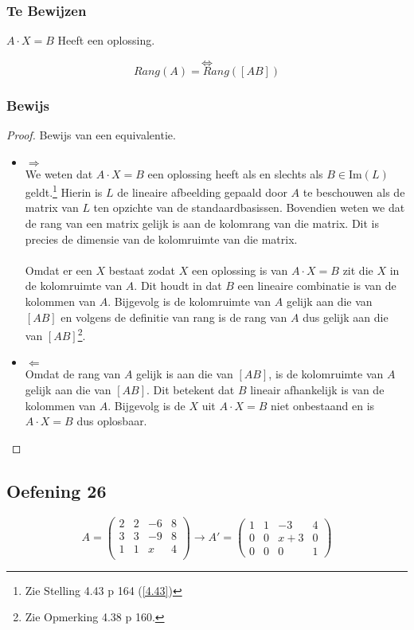 \documentclass[lineaire_algebra_oplossingen.tex]{subfiles}
\begin{document}
\subsubsection*{Te Bewijzen}
\begin{center}
$A\cdot X = B$ Heeft een oplossing.
\end{center}
\[\Leftrightarrow\]
\[Rang(A) = Rang([A B])\]

\subsubsection*{Bewijs}
\begin{proof}
Bewijs van een equivalentie.
\begin{itemize}
\item $\Rightarrow$\\
We weten dat $A\cdot X = B$ een oplossing heeft als en slechts als $B \in \text{Im}(L)$ geldt.\footnote{Zie Stelling 4.43 p 164 (\ref{4.43})} Hierin is $L$ de lineaire afbeelding gepaald door $A$ te beschouwen als de matrix van $L$ ten opzichte van de standaardbasissen.
Bovendien weten we dat de rang van een matrix gelijk is aan de kolomrang van die matrix.
Dit is precies de dimensie van de kolomruimte van die matrix.\\\\
Omdat er een $X$ bestaat zodat $X$ een oplossing is van $A\cdot X = B$ zit die $X$ in de kolomruimte van $A$. Dit houdt in dat $B$ een lineaire combinatie is van de kolommen van $A$. Bijgevolg is de kolomruimte van $A$ gelijk aan die van $[A B]$ en volgens de definitie van rang is de rang van $A$ dus gelijk aan die van $[A B]$\footnote{Zie Opmerking 4.38 p 160.}.

\item $\Leftarrow$\\
Omdat de rang van $A$ gelijk is aan die van $[A B]$, is de kolomruimte van $A$ gelijk aan die van $[A B]$. Dit betekent dat $B$ lineair afhankelijk is van de kolommen van $A$. Bijgevolg is de $X$ uit $A\cdot X = B$ niet onbestaand en is $A\cdot X = B$ dus oplosbaar.
\end{itemize}
\end{proof}


\subsection{Oefening 26}
\[
A = 
\begin{pmatrix}
2 & 2 & -6 & 8\\
3 & 3 & -9 & 8\\
1 & 1 & x & 4\\
\end{pmatrix}
\rightarrow
A'= 
\begin{pmatrix}
1 & 1 & -3 & 4\\
0 & 0 & x+3 & 0\\
0 & 0 & 0 & 1
\end{pmatrix}
\]
\end{document}
